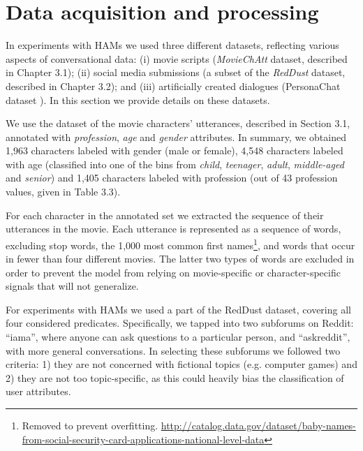 \section{Data acquisition and processing}

In experiments with HAMs we used three different datasets, reflecting various aspects of conversational data: (i) movie scripts (\textit{MovieChAtt} dataset, described in Chapter 3.1); (ii) social media submissions (a subset of the \textit{RedDust} dataset, described in Chapter 3.2); and (iii) artificially created dialogues (PersonaChat dataset \cite{zhang2018personalizing}). In this section we provide details on these datasets.

 We use the dataset of the movie characters' utterances, described in Section 3.1, annotated with \textit{profession}, \textit{age} and \textit{gender} attributes. In summary, we obtained 1,963 characters labeled with gender (male or female), 4,548 characters labeled with age (classified into one of the bins from \textit{child}, \textit{teenager}, \textit{adult}, \textit{middle-aged} and \textit{senior}) and 1,405 characters labeled with profession (out of 43 profession values, given in Table 3.3).

For each character in the annotated set we extracted the sequence of their utterances in the movie.
Each utterance is represented as a sequence of words, excluding stop words, the 1,000 most common first names\footnote{Removed to prevent overfitting. \href{https://catalog.data.gov/dataset/baby-names-from-social-security-card-applications-national-level-data}{http://catalog.data.gov/dataset/baby-names-from-social-security-card-applications-national-level-data}}, and words that occur in fewer than four different movies.
The latter two types of words are excluded in order to prevent the model from relying on movie-specific or character-specific signals that will not generalize.

For experiments with HAMs we used a part of the RedDust dataset, covering all four considered predicates. Specifically, we tapped into two subforums on Reddit: ``iama'', where anyone can ask questions to a particular person, 
and ``askreddit'', with more general conversations. In selecting these subforums we followed two criteria: 1) they are not concerned with fictional topics (e.g. computer games) and 2) they are not too topic-specific, 
as this could heavily bias the classification of user attributes.

